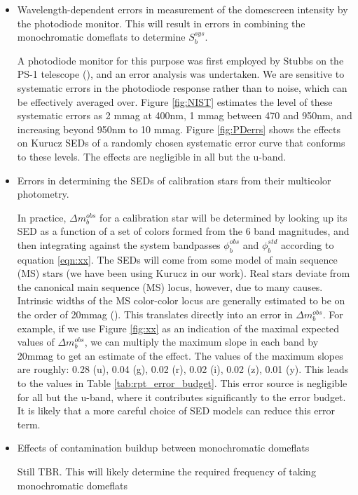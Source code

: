 \documentclass[12pt,preprint]{aastex}
\begin{document}
\begin{itemize}
\item{Wavelength-dependent errors in measurement of the domescreen intensity by the photodiode monitor.  This will result in errors in combining the monochromatic domeflats to determine $S_b^{sys}$.}

A photodiode monitor for this purpose was first employed by Stubbs on the PS-1 telescope (\citep{Stubbs2010a}), and an error analysis
was undertaken.  We are sensitive to systematic errors in the photodiode response rather than to noise, which can be effectively averaged over.  Figure \ref{fig:NIST} estimates the level of these systematic errors as 2 mmag at 400nm, 1 mmag between 470 and 950nm,
and increasing beyond 950nm to 10 mmag.  Figure \ref{fig:PDerrs} shows the effects on Kurucz SEDs of a randomly chosen systematic error curve that conforms to these levels.   The effects are negligible in all but the u-band.

\item{Errors in determining the SEDs of calibration stars from their multicolor photometry.}

In practice, $\Delta m_b^{obs}$ for a calibration star will be determined by looking up its SED as a function of a set of
colors formed from the 6 band magnitudes, and then integrating against the system bandpasses $\phi_b^{obs}$ and $\phi_b^{std}$
according to equation \ref{eqn:xx}.  The SEDs will come from some model of main sequence (MS) stars (we have been using Kurucz in 
our work).  Real stars deviate from the canonical main sequence (MS) locus, however, due to many causes.  Intrinsic widths of the MS
color-color locus are generally estimated to be on the order of 20mmag (\citep{Zeljko, Covey, High}). This translates directly into an error in $\Delta m_b^{obs}$.  For example, if we use Figure \ref{fig:xx} as an indication of the maximal expected values of 
$\Delta m_b^{obs}$, we can multiply the maximum slope in each band by 20mmag to get an estimate of the effect.  The values of
the maximum slopes are roughly:  0.28 (u), 0.04 (g), 0.02 (r), 0.02 (i), 0.02 (z), 0.01 (y).  This leads to the values
in Table \ref{tab:rpt_error_budget}.  This error source is negligible for all but the u-band, 
where it contributes significantly to the error budget.  It is likely that a more careful choice of SED models can reduce this
error term.

\item{Effects of contamination buildup between monochromatic domeflats}

Still TBR.  This will likely determine the required frequency of taking monochromatic domeflats


\end{itemize}
\end{document}
